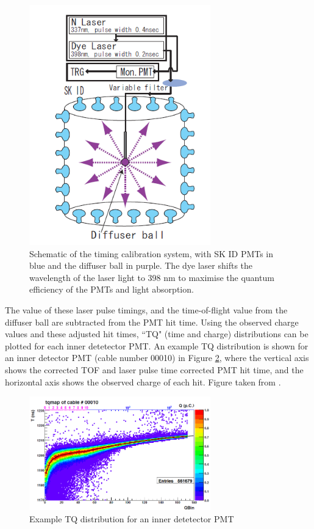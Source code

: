 \begin{figure}
\centering
    \includegraphics[width=0.7\textwidth]{Figures/timecalibsystem.png}
\caption{Schematic of the timing calibration system, with SK ID PMTs in blue and the diffuser ball in purple. The dye laser shifts the wavelength of the laser light to 398 nm to maximise the quantum efficiency of the PMTs and light absorption.}
    \label{fig:timecalibsystem}
\end{figure}


The value of these laser pulse timings, and the time-of-flight value from the diffuser ball are subtracted from the PMT hit time. Using the observed charge values and these adjusted hit times, ``TQ" (time and charge) distributions can be plotted for each inner detetector PMT. An example TQ distribution is shown for an inner detector PMT (cable number 00010) in Figure \ref{fig:TQdist}, where the vertical axis shows the corrected TOF and laser pulse time corrected PMT hit time, and the horizontal axis shows the observed charge of each hit. Figure taken from \cite{abe_calibration_2014}. 

\begin{figure}
    \centering 
    \includegraphics[width=0.7\textwidth]{Figures/TQdist.png}
\caption{Example TQ distribution for an inner detetector PMT}
    \label{fig:TQdist}
\end{figure}


